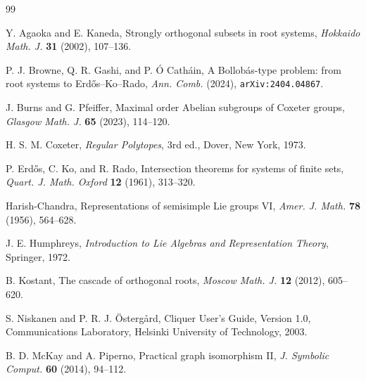 \documentclass[11pt]{article}
\begin{document}
\begin{thebibliography}{99}

 Y. Agaoka and E. Kaneda, Strongly orthogonal subsets in root systems, \textit{Hokkaido Math. J.} \textbf{31} (2002), 107--136.

 P. J. Browne, Q. R. Gashi, and P. \'O Cath\'ain, A Bollob\'as-type problem: from root systems to Erd\H{o}s--Ko--Rado, \textit{Ann. Comb.} (2024), \texttt{arXiv:2404.04867}.

 J. Burns and G. Pfeiffer, Maximal order Abelian subgroups of Coxeter groups, \textit{Glasgow Math. J.} \textbf{65} (2023), 114--120.

 H. S. M. Coxeter, \textit{Regular Polytopes}, 3rd ed., Dover, New York, 1973.

 P. Erd\H{o}s, C. Ko, and R. Rado, Intersection theorems for systems of finite sets, \textit{Quart. J. Math. Oxford} \textbf{12} (1961), 313--320.

 Harish-Chandra, Representations of semisimple Lie groups VI, \textit{Amer. J. Math.} \textbf{78} (1956), 564--628.

 J. E. Humphreys, \textit{Introduction to Lie Algebras and Representation Theory}, Springer, 1972.

 B. Kostant, The cascade of orthogonal roots, \textit{Moscow Math. J.} \textbf{12} (2012), 605--620.

 S. Niskanen and P. R. J. \"Osterg\aa rd, Cliquer User's Guide, Version 1.0, Communications Laboratory, Helsinki University of Technology, 2003.

 B. D. McKay and A. Piperno, Practical graph isomorphism II, \textit{J. Symbolic Comput.} \textbf{60} (2014), 94--112.

\end{thebibliography}
\end{document}
